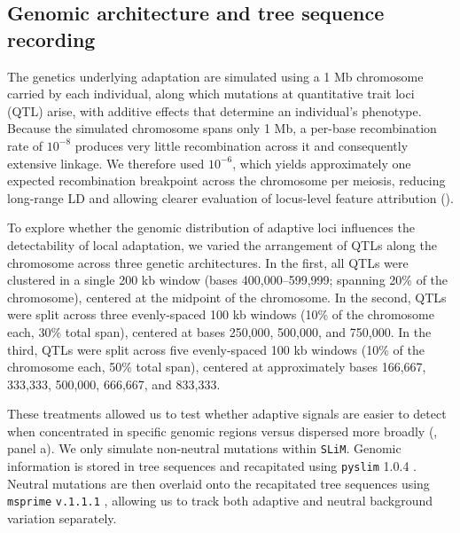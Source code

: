 \documentclass[]{article}
\newcommand{\slim}{\texttt{SLiM}\xspace}
\begin{document}
\subsection{Genomic architecture and tree sequence recording}
The genetics underlying adaptation are simulated using a 1 Mb chromosome 
carried by each individual, 
along which mutations at quantitative trait loci (QTL) 
arise, with additive effects that determine an individual's phenotype.
Because the simulated chromosome spans only 1 Mb,
a per-base recombination rate of \(10^{-8}\)
produces very little recombination across it
and consequently extensive linkage.
We therefore used \(10^{-6}\),
which yields approximately one expected recombination breakpoint
across the chromosome per meiosis,
reducing long-range LD and allowing clearer evaluation of locus-level
feature attribution ().

To explore whether the genomic distribution of adaptive loci
influences the detectability of local adaptation,
we varied the arrangement of QTLs along the chromosome
across three genetic architectures. 
In the first, 
all QTLs were clustered in a single 200 kb window 
(bases 400,000–599,999; spanning 20\% of the chromosome), 
centered at the midpoint of the chromosome. 
In the second, 
QTLs were split across three evenly-spaced 100 kb windows 
(10\% of the chromosome each, 30\% total span), 
centered at bases 250,000, 500,000, and 750,000. 
In the third, 
QTLs were split across five evenly-spaced 100 kb windows 
(10\% of the chromosome each, 50\% total span), 
centered at approximately bases 166,667, 333,333, 500,000, 666,667, and 833,333.

These treatments allowed us to test whether adaptive 
signals are easier to detect when concentrated in 
specific genomic regions versus dispersed more broadly 
(, panel a).
We only simulate non-neutral mutations within \slim.
Genomic information is stored in tree sequences
and recapitated using \texttt{pyslim} 1.0.4 \citep{haller2019treeseq}.
Neutral mutations are then overlaid onto the recapitated tree sequences
using \texttt{msprime} \texttt{v.1.1.1} \citep{baumdicker2022efficient},
allowing us to track both adaptive
and neutral background variation separately.
\end{document}

